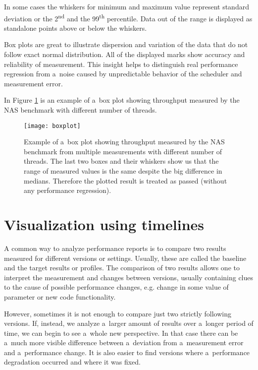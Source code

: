 In some cases the whiskers for minimum and maximum value represent standard
deviation or the 2\textsuperscript{nd} and the 99\textsuperscript{th} percentile. Data
out of the range is displayed as standalone points above or below the whiskers.

Box plots are great to illustrate dispersion and variation of the data that do not
follow exact normal distribution. All of the displayed marks show accuracy and
reliability of measurement. This insight helps to distinguish real performance
regression from a~noise caused by unpredictable behavior of the scheduler and
measurement error.

In Figure \ref{fig:boxplot} is an example of a~box plot showing throughput
measured by the NAS benchmark with different number of threads.  

\begin{figure}
  \centering
  \texttt{[image: boxplot]}
  \caption{Example of a~box plot showing throughput measured by the NAS
    benchmark from multiple measurements with different number of threads. The
    last two boxes and their whiskers show us that the range of measured values
    is the same despite the big difference in medians. Therefore the plotted
    result is treated as passed (without any performance regression).}
  \label{fig:boxplot}
\end{figure}



\chapter{Visualization using timelines} \label{ch:timelines}
A common way to analyze performance reports is to compare two results measured
for different versions or settings. Usually, these are called the baseline and
the target results or profiles. The comparison of two results allows one to
interpret the measurement and changes between versions, usually containing clues
to the cause of possible performance changes, e.g. change in some value of
parameter or new code functionality.

However, sometimes it is not enough to compare just two strictly following
versions. If, instead, we analyze a~larger amount of results over a~longer period
of time, we can begin to see a~whole new perspective. In that case there can be
a~much more visible difference between a~deviation from a~measurement error and
a~performance change. It is also easier to find versions where
a~performance degradation occurred and where it was fixed.


